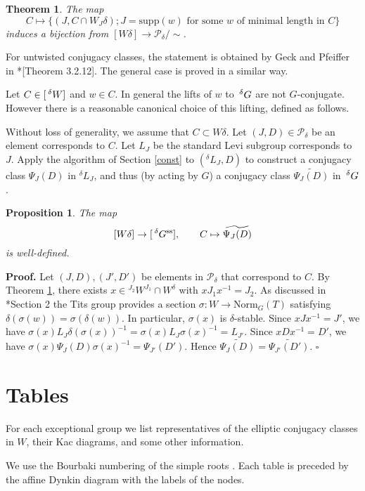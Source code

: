 \documentclass[10pt,leqno]{article}
\newtheorem{theorem}[equation]{Theorem}
\newtheorem{proposition}[equation]{Proposition}
\newcommand{\qed}{\hfill $\square$ \medskip}
\newenvironment{proof}[1][Proof]{\noindent\textbf{#1.} }{\qed}
\newcommand{\Norm}{\text{Norm}}
\renewcommand{\sec}[1]{\section{#1}
\renewcommand{\theequation}{\thesection.\arabic{equation}}
  \setcounter{equation}{0}}
\renewcommand{\ss}{\text{ss}}
\newcommand{\Wext}{\negthinspace\negthinspace\phantom{a}^\delta W}
\newcommand{\Gext}{\negthinspace\negthinspace\phantom{a}^\delta G}
\renewcommand{\sec}[1]{\section{#1}
\renewcommand{\theequation}{\thesection.\arabic{equation}}
  \setcounter{equation}{0}}
\begin{document}
\begin{theorem}\label{cal-P}
	The map $$C \mapsto \{(J, C \cap W_J \delta); J=\text{supp}(w) \text{ for some } w \text{ of minimal length in } C\}$$ induces a bijection from $[W\delta] \to \mathcal P_{\delta}/\sim$. 
\end{theorem}

For untwisted conjugacy classes, the statement is obtained by Geck and
Pfeiffer in \cite{geck_pfeiffer}*[Theorem 3.2.12]. The general case is
proved in a similar way.

Let $C\in [\Wext]$ and $w \in C$. In general the lifts of $w$ to $\Gext$ are not $G$-conjugate. However there is a reasonable canonical choice of this lifting, defined as follows.

Without loss of generality, we assume that $C \subset W \delta$. Let $(J, D) \in \mathcal P_{\delta}$ be an element corresponds to $C$. Let $L_J$ be the standard Levi subgroup corresponds to $J$.  Apply the algorithm of Section \ref{const} to $({}^\delta L_J, D)$ to construct a conjugacy class $\Psi_J(D)$ in ${}^\delta L_J$, and thus (by acting by $G$) a conjugacy class $\widetilde{\Psi_J(D)}$ in $\Gext$.

\begin{proposition} The map $$[W \delta] \to [\Gext^{\ss}], \qquad C \mapsto \widetilde{\Psi_J(D)}$$ is well-defined. 
\end{proposition}

\begin{proof}
	Let $(J, D), (J', D')$ be elements in $\mathcal P_{\delta}$ that correspond to $C$. By Theorem \ref{cal-P}, there exists $x \in {}^{J_2} W^{J_1} \cap W^\delta$ with $x J_1 x^{-1}=J_2$. As discussed in \cite{AH}*{Section 2} the Tits group provides a section $\sigma:W\rightarrow \Norm_G(T)$ satisfying
	$\delta(\sigma(w))=\sigma(\delta(w))$. In particular, $\sigma(x)$ is $\delta$-stable. Since $x J x^{-1}=J'$, we have $\sigma(x) L_J \delta(\sigma(x))^{-1}=\sigma(x) L_J \sigma(x)^{-1}=L_{J'}$. Since $x D x^{-1}=D'$, we have $\sigma(x) \Psi_J(D) \sigma(x)^{-1}=\Psi_{J'}(D')$. Hence $\widetilde{\Psi_J(D)}=\widetilde{\Psi_{J'}(D')}$. 
\end{proof}

\sec{Tables}
\label{s:tables}

For each exceptional group we list representatives of the elliptic conjugacy classes in $W$,
their Kac diagrams, and some other information.

We use the Bourbaki numbering of the simple roots \cite{bourbaki_4-6}.
Each table is preceded by the affine Dynkin diagram with the labels of the nodes.
\end{document}
